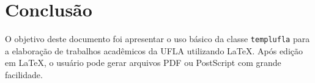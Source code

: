 \chapter{Conclusão}\label{sec:conclusao}

O objetivo deste documento foi apresentar o uso básico da classe \texttt{templufla} para a elaboração de trabalhos acadêmicos da UFLA utilizando \LaTeX. Após edição em \LaTeX, o usuário pode gerar arquivos PDF \cite{PDF2004} ou PostScript \cite{PostScript1999} com grande facilidade.

